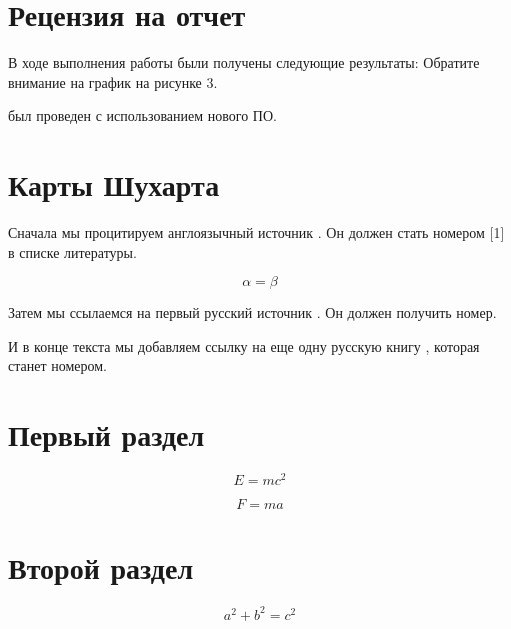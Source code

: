 \documentclass[a4paper,14pt]{extarticle}
\begin{document}

\section{Рецензия на отчет}

В ходе выполнения работы были получены следующие результаты:
\alert{Обратите внимание на график на рисунке 3}.



 был проведен с использованием нового ПО.



\section{Карты Шухарта}

Сначала мы процитируем англоязычный источник \cite{smith2025}. Он должен стать номером [1] в списке литературы.

$$\alpha = \beta$$

Затем мы ссылаемся на первый русский источник \cite{ivanov2024}. Он должен получить номер.

И в конце текста мы добавляем ссылку на еще одну русскую книгу \cite{sidorov2026}, которая станет номером.


\section{Первый раздел}

\begin{equation}
    E = mc^2
    \label{eq:energy}
\end{equation}

\begin{equation}
    F = ma
    \label{eq:force}
\end{equation}

\section{Второй раздел}

\begin{equation}
    a^2 + b^2 = c^2
    \label{eq:pythagoras}
\end{equation}
\end{document}
